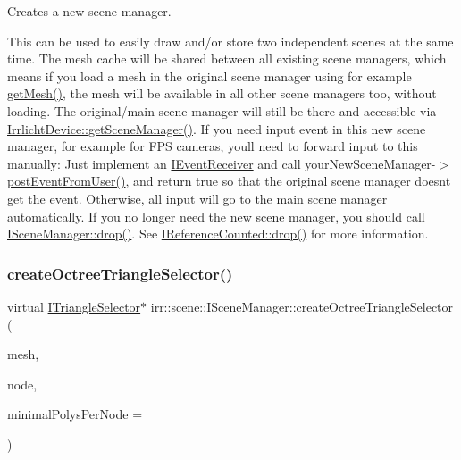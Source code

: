 Creates a new scene manager. 

This can be used to easily draw and/or store two independent scenes at the same time. The mesh cache will be shared between all existing scene managers, which means if you load a mesh in the original scene manager using for example \hyperlink{classirr_1_1scene_1_1ISceneManager_a63894c3f3d46cfc385116f1705935e03}{get\+Mesh()}, the mesh will be available in all other scene managers too, without loading. The original/main scene manager will still be there and accessible via \hyperlink{classirr_1_1IrrlichtDevice_a891b503ff4d5041296d88f23f97d7b3d}{Irrlicht\+Device\+::get\+Scene\+Manager()}. If you need input event in this new scene manager, for example for F\+PS cameras, you\textquotesingle{}ll need to forward input to this manually\+: Just implement an \hyperlink{classirr_1_1IEventReceiver}{I\+Event\+Receiver} and call your\+New\+Scene\+Manager-\/$>$\hyperlink{classirr_1_1scene_1_1ISceneManager_ac68aa8d654884f19ad52fa28f11db424}{post\+Event\+From\+User()}, and return true so that the original scene manager doesn\textquotesingle{}t get the event. Otherwise, all input will go to the main scene manager automatically. If you no longer need the new scene manager, you should call \hyperlink{classirr_1_1IReferenceCounted_a03856a09355b89d178090c4a5f738543}{I\+Scene\+Manager\+::drop()}. See \hyperlink{classirr_1_1IReferenceCounted_a03856a09355b89d178090c4a5f738543}{I\+Reference\+Counted\+::drop()} for more information. \mbox{\label{classirr_1_1scene_1_1ISceneManager_a4ed7d3b34f4d0c70395b6d464fe32b96}} 
\subsubsection{\texorpdfstring{create\+Octree\+Triangle\+Selector()}{createOctreeTriangleSelector()}\hspace{0.1cm}{\footnotesize\ttfamily [1/2]}}
{\footnotesize\ttfamily virtual \hyperlink{classirr_1_1scene_1_1ITriangleSelector}{I\+Triangle\+Selector}$\ast$ irr\+::scene\+::\+I\+Scene\+Manager\+::create\+Octree\+Triangle\+Selector (\begin{DoxyParamCaption}\item[{\hyperlink{classirr_1_1scene_1_1IMesh}{I\+Mesh} $\ast$}]{mesh,  }\item[{\hyperlink{classirr_1_1scene_1_1ISceneNode}{I\+Scene\+Node} $\ast$}]{node,  }\item[{\hyperlink{namespaceirr_ac66849b7a6ed16e30ebede579f9b47c6}{s32}}]{minimal\+Polys\+Per\+Node = {} }\end{DoxyParamCaption})\hspace{0.3cm}{\ttfamily [pure virtual]}}



